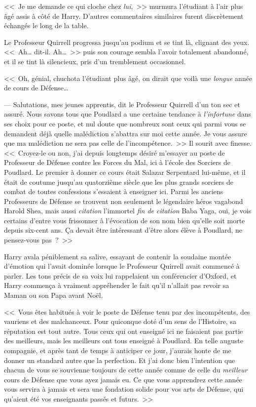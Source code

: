 <<~Je me demande ce qui cloche chez \emph{lui},~>> murmura l'étudiant à l'air plus âgé assis à côté de Harry. D'autres commentaires similaires furent discrètement échangés le long de la table.

Le Professeur Quirrell progressa jusqu'au podium et se tint là, clignant des yeux. <<~Ah… dit-il. Ah…~>> puis son courage sembla l'avoir totalement abandonné, et il se tint là silencieux, pris d'un tremblement occasionnel.

<<~Oh, génial, chuchota l'étudiant plus âgé, on dirait que voilà une \emph{longue} année de cours de Défense…

--- Salutations, mes jeunes apprentis, dit le Professeur Quirrell d'un ton sec et assuré. Nous savons tous que Poudlard a une certaine tendance à \emph{l'infortune} dans ses choix pour ce poste, et nul doute que nombreux sont ceux qui parmi vous se demandent déjà quelle malédiction s'abattra sur moi cette année. Je vous assure que ma malédiction ne sera pas celle de l'incompétence.~>> Il sourit avec finesse. <<~Croyez-le ou non, j'ai depuis longtemps désiré m'essayer au poste de Professeur de Défense contre les Forces du Mal, ici à l'école des Sorciers de Poudlard. Le premier à donner ce cours était Salazar Serpentard lui-même, et il était de coutume jusqu'au quatorzième siècle que les plus grands sorciers de combat de toutes confessions s'essaient à enseigner ici. Parmi les anciens Professeurs de Défense se trouvent non seulement le légendaire héros vagabond Harold Shea, mais aussi \emph{citation} l'immortel \emph{fin de citation} Baba Yaga, oui, je vois certains d'entre vous frissonner à l'évocation de son nom bien qu'elle soit morte depuis six-cent ans. Ça devait être intéressant d'être alors élève à Poudlard, ne pensez-vous pas~?~>>

Harry avala péniblement sa salive, essayant de contenir la soudaine montée d'émotion qui l'avait dominée lorsque le Professeur Quirrell avait commencé à parler. Les tons précis de sa voix lui rappelaient un conférencier d'Oxford, et Harry commença à vraiment appréhender le fait qu'il n'allait pas revoir sa Maman ou son Papa avant Noël.

<<~Vous êtes habitués à voir le poste de Défense tenu par des incompétents, des vauriens et des malchanceux. Pour quiconque doté d'un sens de l'Histoire, sa réputation est tout autre. Tous ceux qui ont enseigné ici ne faisaient pas partie des meilleurs, mais les meilleurs ont tous enseigné à Poudlard. En telle auguste compagnie, et après tant de temps à anticiper ce jour, j'aurais honte de me donner un standard autre que la perfection. Et j'ai donc bien l'intention que chacun de vous se souvienne toujours de cette année comme de celle du \emph{meilleur} cours de Défense que vous ayez jamais eu. Ce que vous apprendrez cette année vous servira à jamais et sera une fondation solide pour vos arts de Défense, qui qu'aient été vos enseignants passés et futurs.~>>

